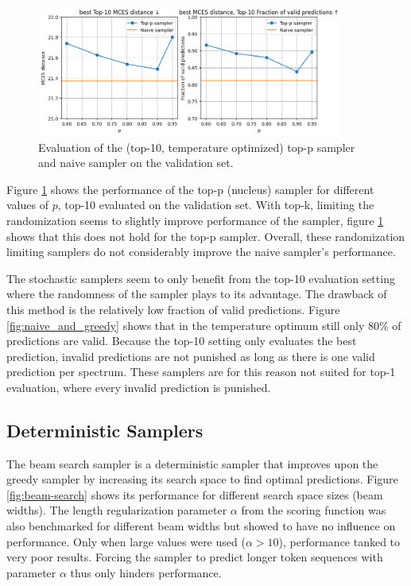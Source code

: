 \begin{figure}[h]
    \centering
    \includegraphics[width=0.9\textwidth]{figures/results/samplers/top-p.png}
    \caption{Evaluation of the (top-10, temperature optimized) top-p sampler and naive sampler on the validation set.}
    \label{fig:top-p}
\end{figure}

Figure \ref{fig:top-p} shows the performance of the top-p (nucleus) sampler for different values of $p$, top-10 evaluated on the validation set.
With top-k, limiting the randomization seems to slightly improve performance of the sampler, figure \ref{fig:top-p} shows that this does not hold for the top-p sampler.
Overall, these randomization limiting samplers do not considerably improve the naive sampler's performance.

The stochastic samplers seem to only benefit from the top-10 evaluation setting where the randomness of the sampler plays to its advantage.
The drawback of this method is the relatively low fraction of valid predictions.
Figure \ref{fig:naive_and_greedy} shows that in the temperature optimum still only $80\%$ of predictions are valid.
Because the top-10 setting only evaluates the best prediction, invalid predictions are not punished as long as there is one valid prediction per spectrum.
These samplers are for this reason not suited for top-1 evaluation, where every invalid prediction is punished.


\subsection{Deterministic Samplers}

The beam search sampler is a deterministic sampler that improves upon the greedy sampler by increasing its search space to find optimal predictions.
Figure \ref{fig:beam-search} shows its performance for different search space sizes (beam widths).
The length regularization parameter $\alpha$ from the scoring function was also benchmarked for different beam widths but showed to have no influence on performance.
Only when large values were used ($\alpha > 10$), performance tanked to very poor results.
Forcing the sampler to predict longer token sequences with parameter $\alpha$ thus only hinders performance.

